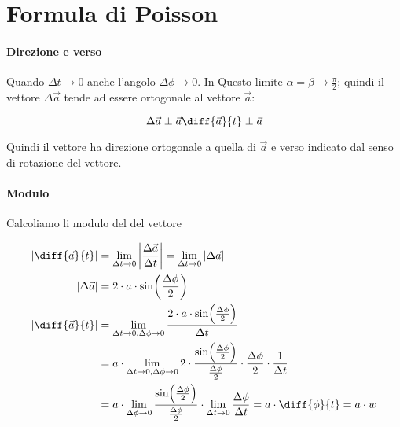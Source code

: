 \section{Formula di Poisson}

\paragraph{Direzione e verso}

Quando $\Delta t \rightarrow 0$ anche l'angolo $\Delta\phi \rightarrow 0$.
In Questo limite $\alpha = \beta \rightarrow \frac{\pi}{2}$; quindi il vettore $\Delta\vec{a}$ tende
ad essere ortogonale al vettore $\vec{a}$:

\begin{equation}
  \Delta \vec{a} \perp \vec{a} \\
  \diff{\vec{a}}{t} \perp \vec{a}
\end{equation}

Quindi il vettore 
ha direzione ortogonale a quella di $\vec{a}$
e verso indicato dal senso di rotazione del vettore.

\paragraph{Modulo}

Calcoliamo li modulo del del vettore 

\begin{equation}
  \begin{split}
    \absolutevalue{\diff{\vec{a}}{t}}
    &= \lim_{\Delta t \to 0} \absolutevalue{\frac{\Delta \vec{a}}{\Delta t}}
    = \lim_{\Delta t \to 0} \absolutevalue{\Delta \vec{a}} \\
    \absolutevalue{\Delta \vec{a}} &= 2 \cdot a \cdot \sin(\frac{\Delta \phi}{2}) \\
    \absolutevalue{\diff{\vec{a}}{t}} &= \lim_{\Delta t \to 0, \Delta\phi \to 0} {
      \frac{2 \cdot a \cdot \sin(\frac{\Delta \phi}{2})}
      {\Delta t}
    } \\
    &= a \cdot \lim_{\Delta t \to 0, \Delta\phi \to 0} {
      2 \cdot
      {
        \frac{\sin(\frac{\Delta \phi}{2})}
        {\frac{\Delta\phi}{2}}
      }
      \cdot \frac{\Delta\phi}{2}
      \cdot \frac{1}{\Delta t}
    } \\
    &= a \cdot \lim_{\Delta\phi \to 0} {
      \frac{\sin(\frac{\Delta \phi}{2})}
      {\frac{\Delta\phi}{2}}
    }
    \cdot \lim_{\Delta t \to 0} {\frac{\Delta\phi}{\Delta t}}
    = a \cdot \diff{\phi}{t}
    = a \cdot w
  \end{split}
\end{equation}

